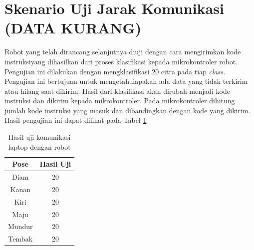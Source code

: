 \section{Skenario Uji Jarak Komunikasi (DATA KURANG)}
Robot yang telah dirancang selanjutnya diuji dengan cara mengirimkan kode instruksiyang dihasilkan dari proses klasifikasi kepada mikrokontroler robot. Pengujian ini dilakukan dengan mengklasifikasi 20 citra pada tiap \emph{class}. Pengujian ini bertujuan untuk mengetahuiapakah ada data yang tidak terkirim atau hilang saat dikirim. Hasil dari klasifikasi akan dirubah menjadi kode instruksi dan dikirim kepada mikrokontroler. Pada mikrokontroler dihitung jumlah kode instruksi yang masuk dan dibandingkan dengan kode yang dikirim. Hasil pengujian ini dapat dilihat pada Tabel \ref{tab:hasulujipose}

\begin{table}[H]
  \centering
  \caption{Hasil uji komunikasi laptop dengan robot}
  \label{tab:hasulujipose}
  \begin{tabular}{|c|c|}
  \hline
  Pose   &  Hasil Uji\\ \hline
  Diam   & 20              \\ \hline
  Kanan  & 20             \\ \hline
  Kiri   & 20              \\ \hline
  Maju   & 20              \\ \hline
  Mundur & 20              \\ \hline
  Tembak & 20              \\ \hline
  \end{tabular}
\end{table}

